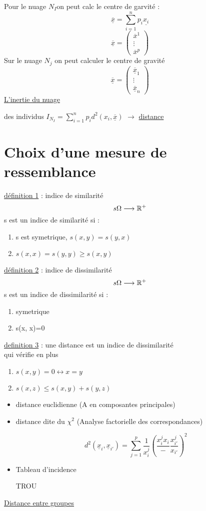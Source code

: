 \documentclass[a4paper]{report}
\begin{document}
 Pour le nuage $N_{I}$on peut calc le centre de garvité :\\
 $$\underline{\overline{x}}=\sum_{i=1}^{n}p_{i}\underline{x_{i}}$$
 $$\underline{\overline{x}}=\begin{pmatrix}
   \overline{x}^{1}\\
   \vdots\\
   \overline{x}^{p}
 \end{pmatrix}
 $$
 Sur le nuage $N_{j}$ on peut calculer le centre de gravité $$\underline{\overline{x}}=\begin{pmatrix}
   \overline{\underline{x}}_{1}\\
   \vdots\\
   \underline{\overline{x}}_{n}
 \end{pmatrix}$$
 \underline{L'inertie du nuage}

 des individus  $I_{N_{I}}=\sum^{n}_{i=1}p_{i}d^{2}(x_{i},\underline{\overline{x}})$
 $\longrightarrow$ \underline{distance}

 \section{Choix d'une mesure de ressemblance}
 \underline{définition 1} : indice de similarité
 $$ s \Omega\time\Omega\longrightarrow\mathbb{R}^{+}$$
 s est un indice de similarité si :
 \begin{enumerate}
   \item s est symetrique, $s(x, y)=s(y, x)$
   \item $s(x, x)=s(y, y) \geq s(x, y)$
 \end{enumerate}
\underline{définition 2} : indice de dissimilarité
$$ s \Omega\time\Omega\longrightarrow\mathbb{R}^{+}$$
s est un indice de dissimilarité si :
\begin{enumerate}
  \item symetrique
    \item s(x, x)=0

\end{enumerate}
\underline{definition 3} : une distance est un indice de dissimilarité\\
qui vérifie en plus
 \begin{enumerate}
   \item $s(x, y)=0 \leftrightarrow x=y$
   \item $s(x, z)\leq s(x,y)+s(y,z)$
 \end{enumerate}
 \begin{itemize}
     \item distance euclidienne (A en composantes principales)
   \item distance dite du $\chi^{2}$ (Analyse factorielle des correspondances)

     $$d^{2}(\underline{x}_{i}, \underline{x}_{i'})=\sum_{j=1}^{p}\dfrac{1}{x^{j}_{i}}(\dfrac{x^{j}_{i}{x_{i}}}-\dfrac{x_{i'}^{j}}{x_{i'}})^{2}$$
   \item Tableau d'incidence

     TROU

\end{itemize}
\underline{Distance entre groupes}
\end{document}

